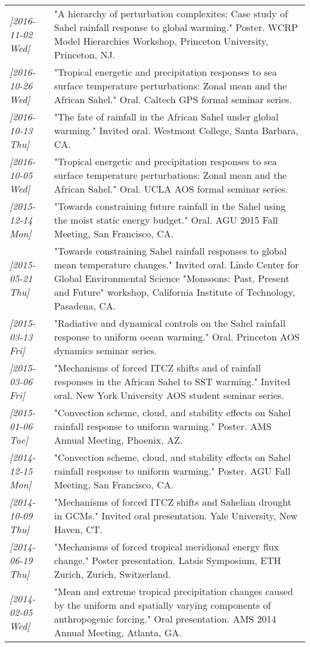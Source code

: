 \documentclass[12pt,letterpaper]{shillcv}
\begin{document}
\begin{center}
\begin{tabularx}{\textwidth}{lX}
\textit{[2016-11-02 Wed]} & "A hierarchy of perturbation complexites: Case study of Sahel rainfall response to global warming."  Poster.  WCRP Model Hierarchies Workshop, Princeton University, Princeton, NJ.\\
\textit{[2016-10-26 Wed]} & "Tropical energetic and precipitation responses to sea surface temperature perturbations: Zonal mean and the African Sahel."  Oral.  Caltech GPS formal seminar series.\\
\textit{[2016-10-13 Thu]} & "The fate of rainfall in the African Sahel under global warming."  Invited oral.  Westmont College, Santa Barbara, CA.\\
\textit{[2016-10-05 Wed]} & "Tropical energetic and precipitation responses to sea surface temperature perturbations: Zonal mean and the African Sahel."  Oral.  UCLA AOS formal seminar series.\\
\textit{[2015-12-14 Mon]} & "Towards constraining future rainfall in the Sahel using the moist static energy budget." Oral.  AGU 2015 Fall Meeting, San Francisco, CA.\\
\textit{[2015-05-21 Thu]} & "Towards constraining Sahel rainfall responses to global mean temperature changes."  Invited oral.  Linde Center for Global Environmental Science "Monsoons: Past, Present and Future" workshop, California Institute of Technology, Pasadena, CA.\\
\textit{[2015-03-13 Fri]} & "Radiative and dynamical controls on the Sahel rainfall response to uniform ocean warming."  Oral.  Princeton AOS dynamics seminar series.\\
\textit{[2015-03-06 Fri]} & "Mechanisms of forced ITCZ shifts and of rainfall responses in the African Sahel to SST warming."  Invited oral.  New York University AOS student seminar series.\\
\textit{[2015-01-06 Tue]} & "Convection scheme, cloud, and stability effects on Sahel rainfall response to uniform warming."  Poster.  AMS Annual Meeting, Phoenix, AZ.\\
\textit{[2014-12-15 Mon]} & "Convection scheme, cloud, and stability effects on Sahel rainfall response to uniform warming."  Poster.  AGU Fall Meeting, San Francisco, CA.\\
\textit{[2014-10-09 Thu]} & "Mechanisms of forced ITCZ shifts and Sahelian drought in GCMs."  Invited oral presentation.  Yale University, New Haven, CT.\\
\textit{[2014-06-19 Thu]} & "Mechanisms of forced tropical meridional energy flux change."  Poster presentation.  Latsis Symposium, ETH Zurich, Zurich, Switzerland.\\
\textit{[2014-02-05 Wed]} & "Mean and extreme tropical precipitation changes caused by the uniform and spatially varying components of anthropogenic forcing."  Oral presentation.  AMS 2014 Annual Meeting, Atlanta, GA.\\
\end{tabularx}
\end{center}
\end{document}
